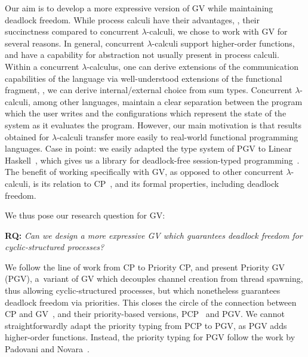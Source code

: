 Our aim is to develop a more expressive version of GV while maintaining deadlock freedom. While process calculi have their advantages, \eg, their succinctness compared to concurrent $\lambda$-calculi, we chose to work with GV for several reasons. In general, concurrent $\lambda$-calculi support higher-order functions, and have a capability for abstraction not usually present in process calculi. Within a concurrent $\lambda$-calculus, one can derive extensions of the communication capabilities of the language via well-understood extensions of the functional fragment, \eg, we can derive internal/external choice from sum types. Concurrent $\lambda$-calculi, among other languages, maintain a clear separation between the program which the user writes and the configurations which represent the state of the system as it evaluates the program. However, our main motivation is that results obtained for $\lambda$-calculi transfer more easily to real-world functional programming languages. Case in point: we easily adapted the type system of PGV to Linear Haskell~\cite{bernardyboespflug18}, which gives us a library for deadlock-free session-typed programming~\cite{kokkedardha21hs}.
The benefit of working specifically with GV, as opposed to other concurrent $\lambda$-calculi, is its relation to CP~\cite{wadler14}, and its formal properties, including deadlock freedom.

We thus pose our research question for GV:

\vspace{1em}
\textbf{RQ:}
\emph{Can we design a more expressive GV which guarantees deadlock freedom for cyclic-structured processes?}
\vspace{1em}

We follow the line of work from CP to Priority CP, and present Priority GV (PGV), a~variant of GV which decouples channel creation from thread spawning, thus allowing cyclic-structured processes, but which nonetheless guarantees deadlock freedom via priorities. This closes the circle of the connection between CP and GV~\cite{wadler14}, and their priority-based versions, PCP~\cite{dardhagay18extended} and PGV.
We cannot straightforwardly adapt the priority typing from PCP to PGV, as PGV adds higher-order functions. Instead, the priority typing for PGV follow the work by Padovani and Novara~\cite{padovaninovara15}.

